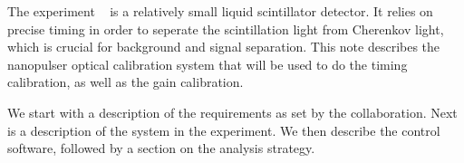 

The \jsns experiment ~\cite{JSNS2TDR} is a relatively small liquid scintillator detector. It relies on precise timing in order to seperate the scintillation light from Cherenkov light, which is crucial for background and signal separation. This note describes the  nanopulser optical calibration system that will be used to do the timing calibration, as well as the gain calibration.

We start with a description of the requirements as set by the \jsns collaboration. Next is a description of the system in the experiment. We then describe the control software, followed by a section on the analysis strategy.

